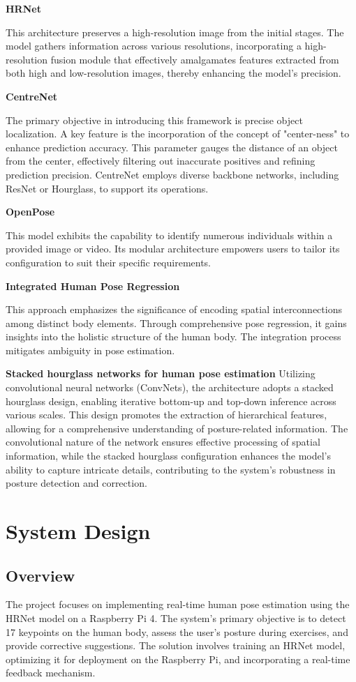 \documentclass{article}
\begin{document}
\textbf{HRNet}

This architecture preserves a high-resolution image from the initial stages. The model gathers information across various resolutions, incorporating a high-resolution fusion module that effectively amalgamates features extracted from both high and low-resolution images, thereby enhancing the model's precision.

\textbf{CentreNet}

The primary objective in introducing this framework is precise object localization. A key feature is the incorporation of the concept of "center-ness" to enhance prediction accuracy. This parameter gauges the distance of an object from the center, effectively filtering out inaccurate positives and refining prediction precision. CentreNet employs diverse backbone networks, including ResNet or Hourglass, to support its operations.

\textbf{OpenPose}

This model exhibits the capability to identify numerous individuals within a provided image or video. Its modular architecture empowers users to tailor its configuration to suit their specific requirements.

\textbf{Integrated Human Pose Regression} 

This approach emphasizes the significance of encoding spatial interconnections among distinct body elements. Through comprehensive pose regression, it gains insights into the holistic structure of the human body. The integration process mitigates ambiguity in pose estimation.

\textbf{Stacked hourglass networks for human pose estimation} 
Utilizing convolutional neural networks (ConvNets), the architecture adopts a stacked hourglass design, enabling iterative bottom-up and top-down inference across various scales. This design promotes the extraction of hierarchical features, allowing for a comprehensive understanding of posture-related information. The convolutional nature of the network ensures effective processing of spatial information, while the stacked hourglass configuration enhances the model's ability to capture intricate details, contributing to the system's robustness in posture detection and correction.




\section{\fontsize{12}{14}\selectfont System Design}
\subsection{Overview}
The project focuses on implementing real-time human pose estimation using the HRNet model on a Raspberry Pi 4. The system's primary objective is to detect 17 keypoints on the human body, assess the user's posture during exercises, and provide corrective suggestions. The solution involves training an HRNet model, optimizing it for deployment on the Raspberry Pi, and incorporating a real-time feedback mechanism.
\end{document}
